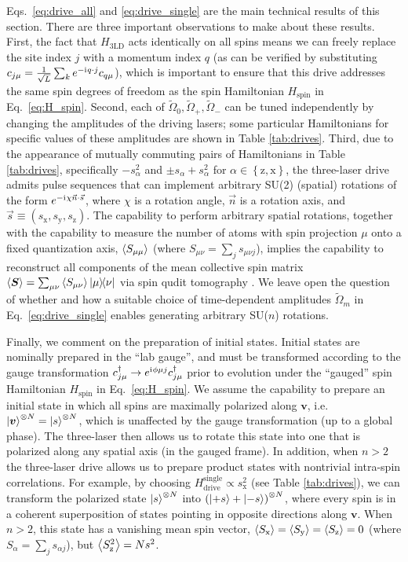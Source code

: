 \documentclass[nofootinbib,twocolumn]{revtex4-2}
\renewcommand{\t}{\text} %
\newcommand{\p}[1]{\left(#1\right)} %
\renewcommand{\set}[1]{\left\{#1\right\}} %
\newcommand{\bk}{\Braket} %
\renewcommand{\v}{\bm} %
\renewcommand{\c}{\cdot} %
\renewcommand{\i}{\mathrm{i}\mkern1mu} %
\newcommand{\1}{\mathds{1}}
\newcommand{\x}{\text{x}}
\newcommand{\y}{\text{y}}
\newcommand{\z}{\text{z}}
\begin{document}
Eqs.~\eqref{eq:drive_all} and \eqref{eq:drive_single} are the main technical results of this section.
There are three important observations to make about these results.
First, the fact that $H_{\t{3LD}}$ acts identically on all spins means we can freely replace the site index $j$ with a momentum index $q$ (as can be verified by substituting $c_{j\mu}=\frac1{\sqrt{L}}\sum_k e^{-\i q\c j} c_{q\mu}$), which is important to ensure that this drive addresses the same spin degrees of freedom as the spin Hamiltonian $H_{\t{spin}}$ in Eq.~\eqref{eq:H_spin}.
Second, each of $\tilde\Omega_0,\tilde\Omega_+,\tilde\Omega_-$ can be tuned independently by changing the amplitudes of the driving lasers; some particular Hamiltonians for specific values of these amplitudes are shown in Table \ref{tab:drives}.
Third, due to the appearance of mutually commuting pairs of Hamiltonians in Table \ref{tab:drives}, specifically $-s_\alpha^2$ and $\pm s_\alpha+s_\alpha^2$ for $\alpha\in\set{\z,\x}$, the three-laser drive admits pulse sequences that can implement arbitrary SU(2) (spatial) rotations of the form $e^{-\i\chi\vec n\c\vec s}$, where $\chi$ is a rotation angle, $\vec n$ is a rotation axis, and $\vec s\equiv(s_\x,s_\y,s_\z)$.
The capability to perform arbitrary spatial rotations, together with the capability to measure the number of atoms with spin projection $\mu$ onto a fixed quantization axis, $\bk{S_{\mu\mu}}$ (where $S_{\mu\nu}=\sum_js_{\mu\nu j}$), implies the capability to reconstruct all components of the mean collective spin matrix $\bk{\v S}=\sum_{\mu\nu}\bk{S_{\mu\nu}}\op{\mu}{\nu}$ via spin qudit tomography \cite{newton1968measurability, perlin2020qudit}.
We leave open the question of whether and how a suitable choice of time-dependent amplitudes $\tilde\Omega_m$ in Eq.~\eqref{eq:drive_single} enables generating arbitrary SU($n$) rotations.

Finally, we comment on the preparation of initial states.
Initial states are nominally prepared in the ``lab gauge'', and must be transformed according to the gauge transformation $c_{j\mu}^\dag\to e^{\i\phi\mu j} c_{j\mu}^\dag$ prior to evolution under the ``gauged'' spin Hamiltonian $H_{\t{spin}}$ in Eq.~\eqref{eq:H_spin}.
We assume the capability to prepare an initial state in which all spins are maximally polarized along $\v v$, i.e.~$\ket{\v v}^{\otimes N}=\ket{s}^{\otimes N}$, which is unaffected by the gauge transformation (up to a global phase).
The three-laser then allows us to rotate this state into one that is polarized along any spatial axis (in the gauged frame).
In addition, when $n>2$ the three-laser drive allows us to prepare product states with nontrivial intra-spin correlations.
For example, by choosing $H_{\t{drive}}^{\t{single}}\propto s_\x^2$ (see Table \ref{tab:drives}), we can transform the polarized state $\ket{s}^{\otimes N}$ into $\p{\ket{+s}+\ket{-s}}^{\otimes N}$, where every spin is in a coherent superposition of states pointing in opposite directions along $\v v$.
When $n>2$, this state has a vanishing mean spin vector, $\bk{S_\x}=\bk{S_\y}=\bk{S_\z}=0$ (where $S_\alpha = \sum_j s_{\alpha j}$), but $\bk{S_\z^2}=Ns^2$.
\end{document}
